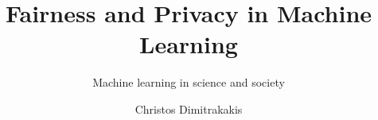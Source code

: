 \documentclass[9pt]{beamer}
\title{Fairness and Privacy in Machine Learning}
\subtitle{Machine learning in science and society}
\author[C. Dimitrakakis]{Christos Dimitrakakis}
\begin{document}
\begin{frame}
  \titlepage
\end{frame}






\end{document}
